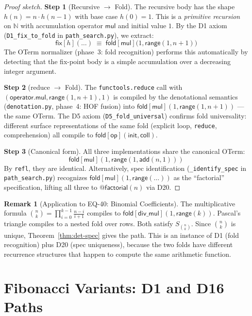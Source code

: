 \documentclass[11pt,a4paper]{report}
\theoremstyle{definition}
\newtheorem{remark}[definition]{Remark}
\theoremstyle{plain}
\newcommand{\Nat}{\mathbb{N}}
\newcommand{\fold}{\mathsf{fold}}
\begin{document}
\begin{proof}[Proof sketch]
\textbf{Step 1} (Recursive $\to$ Fold).  The recursive body has the
shape $h(n) = n \cdot h(n-1)$ with base case $h(0) = 1$.  This is a
\emph{primitive recursion} on $\Nat$ with accumulation operator
$\mathsf{mul}$ and initial value $1$.  By the D1 axiom
(\texttt{D1\_fix\_to\_fold} in \texttt{path\_search.py}), we extract:
\[
  \mathsf{fix}[h](\ldots) \;\equiv\;
  \fold[\mathsf{mul}]\bigl(1, \mathsf{range}(1, n{+}1)\bigr)
\]
The OTerm normalizer (phase~3: fold recognition) performs this
automatically by detecting that the fix-point body is a simple
accumulation over a decreasing integer argument.

\textbf{Step 2} (reduce $\to$ Fold).  The \texttt{functools.reduce}
call with $(\mathsf{operator.mul}, \mathsf{range}(1,n{+}1), 1)$
is compiled by the denotational semantics (\texttt{denotation.py},
phase~4: HOF fusion) into $\fold[\mathsf{mul}](1, \mathsf{range}(1,n{+}1))$
--- the same OTerm.  The D5 axiom (\texttt{D5\_fold\_universal})
confirms fold universality: different surface representations of the
same fold (explicit loop, \texttt{reduce}, comprehension) all compile
to $\fold[\mathsf{op}](\mathsf{init}, \mathsf{coll})$.

\textbf{Step 3} (Canonical form).  All three implementations share
the canonical OTerm:
\[
  \fold[\mathsf{mul}](1, \mathsf{range}(1, \mathsf{add}(n, 1)))
\]
By \texttt{refl}, they are identical.  Alternatively, spec
identification (\texttt{\_identify\_spec} in \texttt{path\_search.py})
recognizes $\fold[\mathsf{mul}](1, \mathsf{range}(\ldots))$ as the
``factorial'' specification, lifting all three to
$\mathsf{@factorial}(n)$ via D20.
\end{proof}

\begin{remark}[Application to EQ-40: Binomial Coefficients]
The multiplicative formula
$\binom{n}{k} = \prod_{i=0}^{k-1} \frac{n-i}{i+1}$
compiles to
$\fold[\mathsf{div\_mul}](1, \mathsf{range}(k))$.
Pascal's triangle compiles to a nested fold over rows.
Both satisfy $S_{\binom{n}{k}}$.  Since $\binom{n}{k}$ is unique,
Theorem~\ref{thm:det-spec} gives the path.  This is an instance of
D1 (fold recognition) plus D20 (spec uniqueness), because the two
folds have different recurrence structures that happen to compute
the same arithmetic function.
\end{remark}

\section{Fibonacci Variants: D1 and D16 Paths}
\label{sec:fibonacci-variants}
\end{document}

